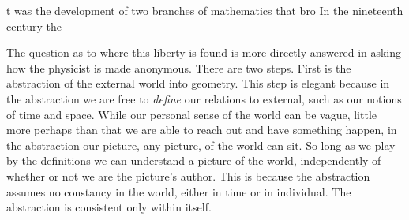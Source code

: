 t was the development of two branches of mathematics that bro
In the nineteenth century the 

%

%














The question as to where this liberty is found is more directly answered
in asking how the physicist is  made anonymous.
There are two steps.
First is the abstraction of the external world into geometry.
This step is  elegant because in the abstraction we are free to {\em
define} our relations to external,  
such as our notions of time and space.
While our personal sense of the world can be vague, 
little more perhaps than that we are able to reach out and have something
happen,
in the abstraction our picture, 
any picture,
of the world can sit.
So long as we play by the definitions we can
understand a picture of the world,
independently of  
whether or not we are the picture's author.
This is because the abstraction assumes no constancy in the world,
either in time or in individual. 
The abstraction is consistent only within itself.

